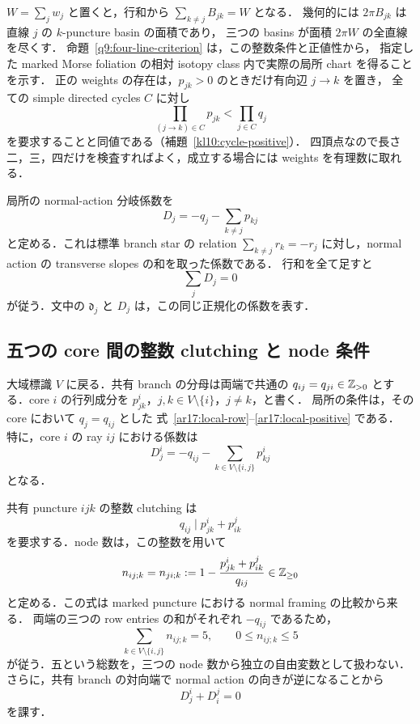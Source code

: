 $W=\sum_jw_j$ と置くと，行和から $\sum_{k\ne j}B_{jk}=W$ となる．
幾何的には $2\pi B_{jk}$ は直線 $j$ の $k$-puncture basin の面積であり，
三つの basins が面積 $2\pi W$ の全直線を尽くす．
命題~\ref{q9:four-line-criterion} は，この整数条件と正値性から，
指定した marked Morse foliation の相対 isotopy class 内で実際の局所 chart を得ることを示す．
正の weights の存在は，$p_{jk}>0$ のときだけ有向辺 $j\to k$ を置き，
全ての simple directed cycles $C$ に対し
\begin{equation}\label{ar17:positive-cycles}
 \prod_{(j\to k)\in C}p_{jk}<\prod_{j\in C}q_j
\end{equation}
を要求することと同値である（補題~\ref{kl10:cycle-positive}）．
四頂点なので長さ二，三，四だけを検査すればよく，成立する場合には weights を有理数に取れる．

局所の normal-action 分岐係数を
\begin{equation}\label{ar17:D-local}
 D_j=-q_j-\sum_{k\ne j}p_{kj}
\end{equation}
と定める．これは標準 branch star の relation
$\sum_{k\ne j}r_k=-r_j$ に対し，normal action の transverse slopes の和を取った係数である．
行和を全て足すと
\begin{equation}\label{ar17:D-sum}
 \sum_jD_j=0
\end{equation}
が従う．文中の $\mathfrak d_j$ と $D_j$ は，この同じ正規化の係数を表す．

\subsection{五つの core 間の整数 clutching と node 条件}

大域標識 $V$ に戻る．共有 branch の分母は両端で共通の
$q_{ij}=q_{ji}\in\mathbb Z_{>0}$ とする．core $i$ の行列成分を
$p^i_{jk}$，$j,k\in V\setminus\{i\}$，$j\ne k$，と書く．
局所の条件は，その core において $q_j=q_{ij}$ とした
式~\eqref{ar17:local-row}--\eqref{ar17:local-positive} である．
特に，core $i$ の ray $ij$ における係数は
\begin{equation}\label{ar17:D-global}
 D^i_j=-q_{ij}-\sum_{k\in V\setminus\{i,j\}}p^i_{kj}
\end{equation}
となる．

共有 puncture $ijk$ の整数 clutching は
\begin{equation}\label{ar17:clutching}
 q_{ij}\mid p^i_{jk}+p^j_{ik}
\end{equation}
を要求する．node 数は，この整数を用いて
\begin{equation}\label{ar17:node}
 n_{ij;k}=n_{ji;k}
 :=1-\frac{p^i_{jk}+p^j_{ik}}{q_{ij}}
 \in\mathbb Z_{\ge0}
\end{equation}
と定める．この式は marked puncture における normal framing の比較から来る．
両端の三つの row entries の和がそれぞれ $-q_{ij}$ であるため，
\begin{equation}\label{ar17:node-budget}
 \sum_{k\in V\setminus\{i,j\}}n_{ij;k}=5,
 \qquad 0\le n_{ij;k}\le5
\end{equation}
が従う．五という総数を，三つの node 数から独立の自由変数として扱わない．
さらに，共有 branch の対向端で normal action の向きが逆になることから
\begin{equation}\label{ar17:D-opposition}
 D^i_j+D^j_i=0
\end{equation}
を課す．

